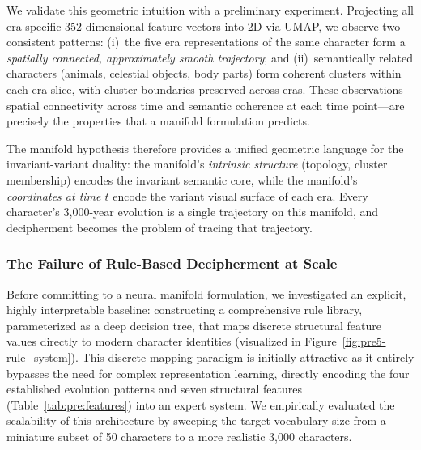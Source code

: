 \documentclass{article}
\begin{document}
We validate this geometric intuition with a preliminary experiment. Projecting all era-specific 352-dimensional feature vectors into 2D via UMAP, we observe two consistent patterns: (i)~the five era representations of the same character form a \emph{spatially connected, approximately smooth trajectory}; and (ii)~semantically related characters (animals, celestial objects, body parts) form coherent clusters within each era slice, with cluster boundaries preserved across eras. These observations—spatial connectivity across time and semantic coherence at each time point—are precisely the properties that a manifold formulation predicts.

The manifold hypothesis therefore provides a unified geometric language for the invariant-variant duality: the manifold's \emph{intrinsic structure} (topology, cluster membership) encodes the invariant semantic core, while the manifold's \emph{coordinates at time $t$} encode the variant visual surface of each era. Every character's 3,000-year evolution is a single trajectory on this manifold, and decipherment becomes the problem of tracing that trajectory.

\subsubsection{The Failure of Rule-Based Decipherment at Scale}
\label{sec:pre:s12}

Before committing to a neural manifold formulation, we investigated an explicit, highly interpretable baseline: constructing a comprehensive rule library, parameterized as a deep decision tree, that maps discrete structural feature values directly to modern character identities (visualized in Figure~\ref{fig:pre5-rule_system}). This discrete mapping paradigm is initially attractive as it entirely bypasses the need for complex representation learning, directly encoding the four established evolution patterns and seven structural features (Table~\ref{tab:pre:features}) into an expert system. We empirically evaluated the scalability of this architecture by sweeping the target vocabulary size from a miniature subset of 50 characters to a more realistic 3,000 characters.
\end{document}
